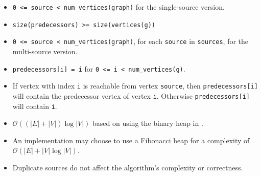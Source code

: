 \begin{itemdescr}
      \pnum\hardprecond
            \begin{itemize}
                  \item
                        \lstinline{0 <= source < num_vertices(graph)} for the single-source version.
                  \item
                        \lstinline{size(predecessors) >= size(vertices(g))}
            \end{itemize}
      \pnum\preconditions
            \begin{itemize}
                  \item
                        \lstinline{0 <= source < num_vertices(graph)}, for each \lstinline{source} in \lstinline{sources}, 
                                   for the multi-source version.
                  \item
                        \lstinline{predecessors[i] = i} for \lstinline{0 <= i < num_vertices(g)}.
            \end{itemize}
      \pnum\effects
            \begin{itemize}
                  \item
                        If vertex with index \lstinline{i} is reachable
                        from vertex \lstinline{source}, then \lstinline{predecessors[i]} will contain the
                        predecessor vertex of vertex \lstinline{i}. Otherwise \lstinline{predecessors[i]} will contain
                        \lstinline{i}.
            \end{itemize}
      \pnum\complexity
            \begin{itemize}
                  \item $\mathcal{O}((|E| + |V|)\log{|V|})$ based on using the binary heap in .
                  \item An implementation may choose to use a Fibonacci heap for a complexity of $\mathcal{O}(|E| + |V|\log{|V|})$.
            \end{itemize}
      \pnum\remarks 
            \begin{itemize}
                  \item Duplicate sources do not affect the algorithm's complexity or correctness.
            \end{itemize}
\end{itemdescr}



